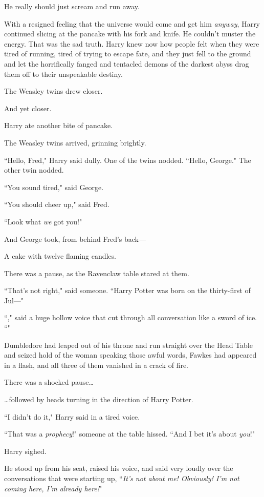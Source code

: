 He really should just scream and run away.

With a resigned feeling that the universe would come and get him \emph{anyway}, Harry continued slicing at the pancake with his fork and knife. He couldn't muster the energy. That was the sad truth. Harry knew now how people felt when they were tired of running, tired of trying to escape fate, and they just fell to the ground and let the horrifically fanged and tentacled demons of the darkest abyss drag them off to their unspeakable destiny.

The Weasley twins drew closer.

And yet closer.

Harry ate another bite of pancake.

The Weasley twins arrived, grinning brightly.

``Hello, Fred," Harry said dully. One of the twins nodded. ``Hello, George." The other twin nodded.

``You sound tired," said George.

``You should cheer up," said Fred.

``Look what \emph{we} got you!"

And George took, from behind Fred's back---

A cake with twelve flaming candles.

There was a pause, as the Ravenclaw table stared at them.

``That's not right," said someone. ``Harry Potter was born on the thirty-first of Jul---"

``," said a huge hollow voice that cut through all conversation like a sword of ice. ``"

Dumbledore had leaped out of his throne and run straight over the Head Table and seized hold of the woman speaking those awful words, Fawkes had appeared in a flash, and all three of them vanished in a crack of fire.

There was a shocked pause{\ldots}

{\ldots}followed by heads turning in the direction of Harry Potter.

``I didn't do it," Harry said in a tired voice.

``That was a \emph{prophecy}!" someone at the table hissed. ``And I bet it's about \emph{you}!"

Harry sighed.

He stood up from his seat, raised his voice, and said very loudly over the conversations that were starting up, ``\emph{It's not about me! Obviously! I'm not coming here, I'm already here!}"

